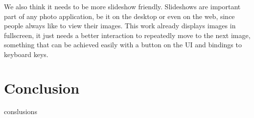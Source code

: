 We also think it needs to be more slideshow friendly. Slideshows are important part of any photo application, be it on the desktop or even on the web, since people always like to view their images. This work already displays images in fullscreen, it just needs a better interaction to repeatedly move to the next image, something that can be achieved easily with a button on the \ac{UI} and bindings to keyboard keys.




\section{Conclusion} %
\label{sec:conclusion}

conslusions



